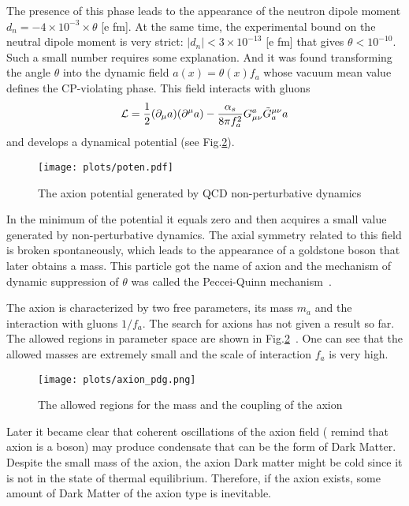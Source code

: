 \documentclass{cernyrep}
\begin{document}
The presence of this phase leads to the appearance of  the neutron dipole moment $d_n=-4\times 10^{-3}\times \theta$ [e fm]. At the same time, the experimental bound on the neutral dipole moment is very strict: $|d_n|<3\times 10^{-13}$ [e fm] that gives $\theta <10^{-10}$. Such a small number requires some explanation. And it was found transforming the angle $\theta$ into the dynamic field $a(x)=\theta(x)f_a$ whose vacuum mean value defines the CP-violating phase. This field interacts with gluons 
\begin{equation}
{\cal L}=\frac 12(\partial_\mu a)(\partial^\mu a)-\frac{\alpha_s}{8\pi f_a^2}G_{\mu\nu}^a\tilde G_a^{\mu\nu}a
\end{equation}
and develops a dynamical potential (see Fig.\ref{axion}).
 \begin{figure}[ht!]
\begin{center}
\leavevmode
\texttt{[image: plots/poten.pdf]}
\end{center}
\caption{The axion potential generated by QCD non-perturbative dynamics}
\label{axion}
\end{figure}
In the minimum of the potential it equals zero and then acquires a small value generated by non-perturbative dynamics. The axial symmetry related to this field is broken spontaneously, which leads to the appearance of a goldstone boson that later obtains a mass. This particle got the name of axion and the mechanism of dynamic suppression of  $\theta$ was called the Peccei-Quinn mechanism~\cite{PQ}.

The axion is characterized by two free parameters, its mass $m_a$ and the interaction with gluons
$1/f_a$. The search for axions has not given a result so far. The allowed regions in parameter space are shown in Fig.\ref{axion}~\cite{PDG_axion}. One can see that the allowed masses are extremely small and the scale of interaction  $f_a$ is very high.
 \begin{figure}[ht!]
\begin{center}
\leavevmode
\texttt{[image: plots/axion\_pdg.png]}
\end{center}
\caption{The allowed regions for the mass and the coupling of the axion}
\label{axion}
\end{figure}

Later it became clear that coherent oscillations of the axion field ( remind that axion is a boson)
may produce condensate that can be the form of Dark Matter. Despite the small mass of the axion, the axion Dark matter might be cold since it is not in the state of thermal equilibrium. Therefore, if the axion exists, some amount of Dark Matter of the axion type is inevitable. 
\end{document}
